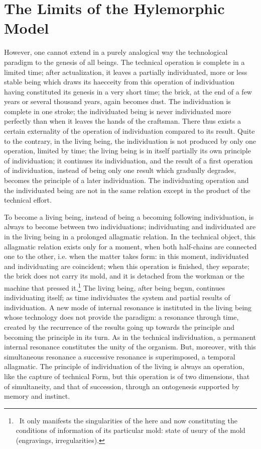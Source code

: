 \documentclass[a4paper]{article}
\begin{document}

\newpage
\section{The Limits of the Hylemorphic Model}

However, one cannot extend in a purely analogical way the technological paradig\-m to the genesis of all beings. The technical operation is complete in a limited time; after actualization, it leaves a partially individuated, more or less stable being which draws its haecceity from this operation of individuation having constituted its genesis in a very short time; the brick, at the end of a few years or several thousand years, again becomes dust. The individuation is complete in one stroke; the individuated being is never individuated more perfectly than when it leaves the hands of the craftsman. There thus exists a certain externality of the operation of individuation compared to its result. Quite to the contrary, in the living being, the individuation is not produced by only one operation, limited by time; the living being is in itself partially its own principle of individuation; it continues its individuation, and the result of a first operation of individuation, instead of being only one result which gradually degrades, becomes the principle of a later individuation. The individuating operation and the individuated being are not in the same relation except in the product of the technical effort.

To become a living being, instead of being a becoming following individuation, is always to become between two individuations; individuating and individuated are in the living being in a prolonged allagmatic relation. In the technical object, this allagmatic relation exists only for a moment, when both half-chains are connected one to the other, i.e. when the matter takes form: in this moment, individuated and individuating are coincident; when this operation is finished, they separate; the brick does not carry its mold, and it is detached from the workman or the machine that pressed it.\footnote{\ It only manifests the singularities of the here and now constituting the conditions of information of its particular mold: state of usury of the mold (engravings, irregularities).} The living being, after being begun, continues individuating itself; as time individuates the system and partial results of individuation. A new mode of internal resonance is instituted in the living being whose technology does not provide the paradigm: a resonance through time, created by the recurrence of the results going up towards the principle and becoming the principle in its turn. As in the technical individuation, a permanent internal resonance constitutes the unity of the organism. But, moreover, with this simultaneous resonance a successive resonance is superimposed, a temporal allagmatic. The principle of individuation of the living is always an operation, like the capture of technical Form, but this operation is of two dimensions, that of simultaneity, and that of succession, through an ontogenesis supported by memory and instinct.
\end{document}
